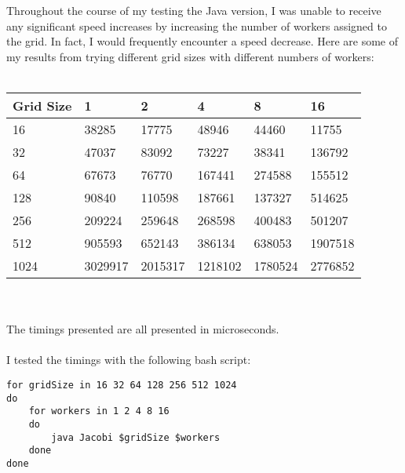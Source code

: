\documentclass{article}%
\begin{document}
Throughout the course of my testing the Java version, I was unable to receive any significant speed increases by increasing the number of workers assigned to the grid. In fact, I would frequently encounter a speed decrease. Here are some of my results from trying different grid sizes with different numbers of workers:\\
\\
\begin{tabular}{| l | l | l | l | l | l |}
    \hline
    Grid Size & 1 & 2 & 4 & 8 & 16\\ \hline
    16 & 38285 & 17775 & 48946 & 44460 & 11755 \\ \hline
    32 & 47037 & 83092 & 73227 & 38341 & 136792\\ \hline
    64 & 67673 & 76770 & 167441 & 274588 & 155512\\ \hline
    128 & 90840 & 110598 & 187661 & 137327 & 514625 \\ \hline
    256 & 209224 & 259648 & 268598 & 400483 & 501207 \\ \hline
    512 & 905593 & 652143 & 386134 & 638053 & 1907518 \\ \hline
    1024 & 3029917 & 2015317 & 1218102 & 1780524 & 2776852 \\ \hline
\end{tabular}\\
\\
The timings presented are all presented in microseconds.\\
\\
I tested the timings with the following bash script:\\
\hline
\begin{verbatim}
for gridSize in 16 32 64 128 256 512 1024
do
    for workers in 1 2 4 8 16
    do
        java Jacobi $gridSize $workers
    done
done
\end{verbatim}
\hline
\end{document}
